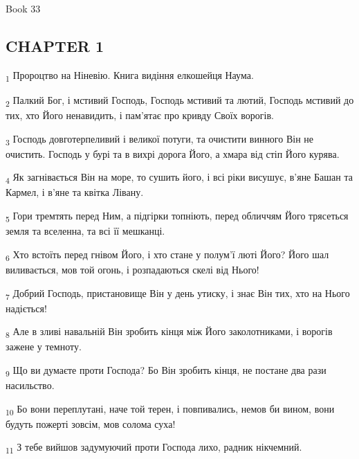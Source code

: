 Book 33
\subsection{CHAPTER 1}
\begin{tcolorbox}
\textsubscript{1} Пророцтво на Ніневію. Книга видіння елкошейця Наума.
\end{tcolorbox}
\begin{tcolorbox}
\textsubscript{2} Палкий Бог, і мстивий Господь, Господь мстивий та лютий, Господь мстивий до тих, хто Його ненавидить, і пам'ятає про кривду Своїх ворогів.
\end{tcolorbox}
\begin{tcolorbox}
\textsubscript{3} Господь довготерпеливий і великої потуги, та очистити винного Він не очистить. Господь у бурі та в вихрі дорога Його, а хмара від стіп Його курява.
\end{tcolorbox}
\begin{tcolorbox}
\textsubscript{4} Як загнівається Він на море, то сушить його, і всі ріки висушує, в'яне Башан та Кармел, і в'яне та квітка Лівану.
\end{tcolorbox}
\begin{tcolorbox}
\textsubscript{5} Гори тремтять перед Ним, а підгірки топніють, перед обличчям Його трясеться земля та вселенна, та всі її мешканці.
\end{tcolorbox}
\begin{tcolorbox}
\textsubscript{6} Хто встоїть перед гнівом Його, і хто стане у полум'ї люті Його? Його шал виливається, мов той огонь, і розпадаються скелі від Нього!
\end{tcolorbox}
\begin{tcolorbox}
\textsubscript{7} Добрий Господь, пристановище Він у день утиску, і знає Він тих, хто на Нього надіється!
\end{tcolorbox}
\begin{tcolorbox}
\textsubscript{8} Але в зливі навальній Він зробить кінця між Його заколотниками, і ворогів зажене у темноту.
\end{tcolorbox}
\begin{tcolorbox}
\textsubscript{9} Що ви думаєте проти Господа? Бо Він зробить кінця, не постане два рази насильство.
\end{tcolorbox}
\begin{tcolorbox}
\textsubscript{10} Бо вони переплутані, наче той терен, і повпивались, немов би вином, вони будуть пожерті зовсім, мов солома суха!
\end{tcolorbox}
\begin{tcolorbox}
\textsubscript{11} З тебе вийшов задумуючий проти Господа лихо, радник нікчемний.
\end{tcolorbox}
